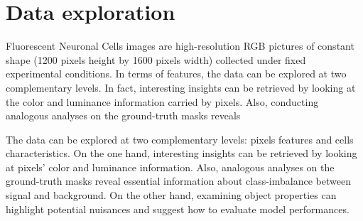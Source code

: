 \section{Data exploration}

Fluorescent Neuronal Cells images are high-resolution RGB pictures of constant shape (1200 pixels height by 1600 pixels width) collected under fixed experimental conditions.
In terms of features, the data can be explored at two complementary levels. 
In fact, interesting insights can be retrieved by looking at the color and luminance information carried by pixels. Also, conducting analogous analyses on the ground-truth masks reveals

The data can be explored at two complementary levels: pixels features and cells characteristics. 
On the one hand, interesting insights can be retrieved by looking at pixels' color and luminance information. Also, analogous analyses on the ground-truth masks reveal essential information about class-imbalance between signal and background.
On the other hand, examining object properties can highlight potential nuisances and suggest how to evaluate model performances.

